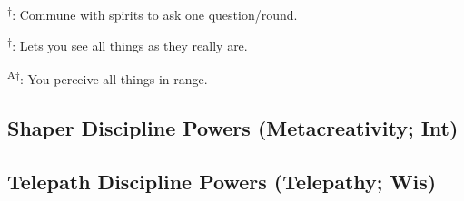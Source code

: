 \begin{enumerate*}
\item 
\item 
\item {}\textsuperscript{$\dagger$}: Commune with spirits to ask one question/round.

\textsuperscript{$\dagger$}: Lets you see all things as they really are.

\item {}\textsuperscript{A$\dagger$}: You perceive all things in range. %
\end{enumerate*}



\subsection{Shaper Discipline Powers {\normalsize(Metacreativity; Int)}}
\begin{enumerate*}
\item
\item
\item
\item
\item
\item
\item
\item
\item
\end{enumerate*}



\subsection{Telepath Discipline Powers {\normalsize(Telepathy; Wis)}}
\begin{enumerate*}
\item
\item
\item
\item
\item
\item
\item
\item
\item
\end{enumerate*}